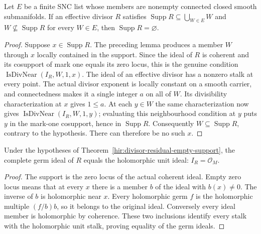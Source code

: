 \begin{theorem}
\label{hir:divisor-residual-empty-support}
\leanok
Let $E$ be a finite SNC list whose members are nonempty connected closed
smooth submanifolds.  If an effective divisor $R$ satisfies
$\operatorname{Supp}R\subseteq\bigcup_{W\in E}W$ and
$W\not\subseteq\operatorname{Supp}R$ for every $W\in E$, then
$\operatorname{Supp}R=\varnothing$.
\end{theorem}
\begin{proof}
Suppose $x\in\operatorname{Supp}R$.  The preceding lemma produces a
member $W$ through $x$ locally contained in the support.  Since the
ideal of $R$ is coherent and its cosupport of mark one equals its zero
locus, this is the genuine condition
$\operatorname{IsDivNear}(I_R,W,1,x)$.
The ideal of an effective divisor has a nonzero stalk at every point.
The actual divisor exponent is locally constant on a smooth carrier,
and connectedness makes it a single integer $a$ on all of $W$.
Its divisibility characterization at $x$ gives $1\le a$.
At each $y\in W$ the same characterization now gives
$\operatorname{IsDivNear}(I_R,W,1,y)$; evaluating this neighbourhood
condition at $y$ puts $y$ in the mark-one cosupport, hence in
$\operatorname{Supp}R$.  Consequently $W\subseteq\operatorname{Supp}R$,
contrary to the hypothesis.  There can therefore be no such $x$.
\end{proof}

\begin{theorem}
\label{hir:divisor-residual-unit}
\leanok
Under the hypotheses of Theorem~\ref{hir:divisor-residual-empty-support},
the complete germ ideal of $R$ equals the holomorphic unit ideal:
$I_R=\mathcal O_M$.
\end{theorem}
\begin{proof}
The support is the zero locus of the actual coherent ideal.  Empty
zero locus means that at every $x$ there is a member $b$ of the ideal
with $b(x)\ne0$.  The inverse of $b$ is holomorphic near $x$.
Every holomorphic germ $f$ is the holomorphic multiple $(f/b)b$, so it
belongs to the original ideal.  Conversely every ideal member is
holomorphic by coherence.  These two inclusions identify every stalk
with the holomorphic unit stalk, proving equality of the germ ideals.
\end{proof}

